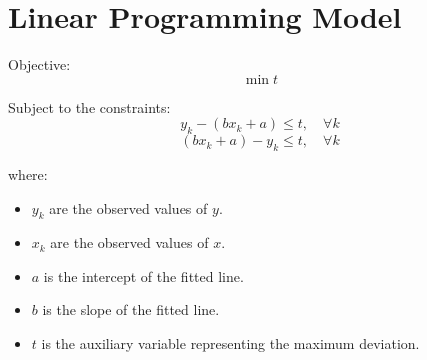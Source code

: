 \documentclass{article}
\begin{document}
\section*{Linear Programming Model}

Objective:
\[
\min t
\]

Subject to the constraints:
\[
y_k - (bx_k + a) \leq t, \quad \forall k 
\]
\[
(bx_k + a) - y_k \leq t, \quad \forall k
\]

where:
\begin{itemize}
    \item \( y_k \) are the observed values of \( y \).
    \item \( x_k \) are the observed values of \( x \).
    \item \( a \) is the intercept of the fitted line.
    \item \( b \) is the slope of the fitted line.
    \item \( t \) is the auxiliary variable representing the maximum deviation.
\end{itemize}
\end{document}
